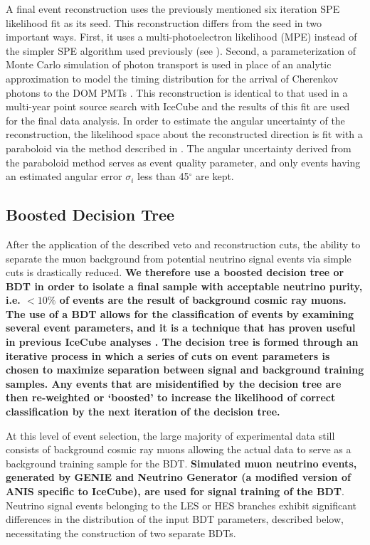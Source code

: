 \documentclass[manuscript]{aastex}
\begin{document}
A final event reconstruction uses the previously mentioned six iteration SPE likelihood fit as its seed. This reconstruction differs from the seed in two important ways. First, it uses a multi-photoelectron likelihood (MPE) instead of the simpler SPE algorithm used previously (see \cite{2004NIMPA.524..169A}). Second, a parameterization of Monte Carlo simulation of photon transport is used in place of an analytic approximation to model the timing distribution for the arrival of Cherenkov photons to the DOM PMTs \citep{2013CoPhC.184.2214W}. This reconstruction is identical to that used in a multi-year point source search with IceCube \citep{2014ApJ...796..109A} and the results of this fit are used for the final data analysis. In order to estimate the angular uncertainty of the reconstruction, the likelihood space about the reconstructed direction is fit with a paraboloid via the method described in \cite{2006APh....25..220N}. The angular uncertainty derived from the paraboloid method serves as event quality parameter, and only events having an estimated angular error $\sigma_i$ less than 45$^{\circ}$ are kept.
 
\subsection{Boosted Decision Tree}
After the application of the described veto and reconstruction cuts, the ability to separate the muon background from potential neutrino signal events via simple cuts is drastically reduced. \textbf{We therefore use a boosted decision tree or BDT \citep{hastie01statisticallearning} in order to isolate a final sample with acceptable neutrino purity, i.e. $<10 \%$ of events are the result of background cosmic ray muons. The use of a BDT allows for the classification of events by examining several event parameters, and it is a technique that has proven useful in previous IceCube analyses \citep{2013ApJ...779..132A}. The decision tree is formed through an iterative process in which a series of cuts on event parameters is chosen to maximize separation between signal and background training samples. Any events that are misidentified by the decision tree are then re-weighted or `boosted' to increase the likelihood of correct classification by the next iteration of the decision tree.}

At this level of event selection, the large majority of experimental data still consists of background cosmic ray muons allowing the actual data to serve as a background training sample for the BDT. \textbf{Simulated muon neutrino events, generated by GENIE \citep{2010NIMPA.614...87A} and Neutrino Generator (a modified version of ANIS \citep{2005CoPhC.172..203G} specific to IceCube), are used for signal training of the BDT}. Neutrino signal events belonging to the LES or HES branches exhibit significant differences in the distribution of the input BDT parameters, described below, necessitating the construction of two separate BDTs. 
\end{document}
